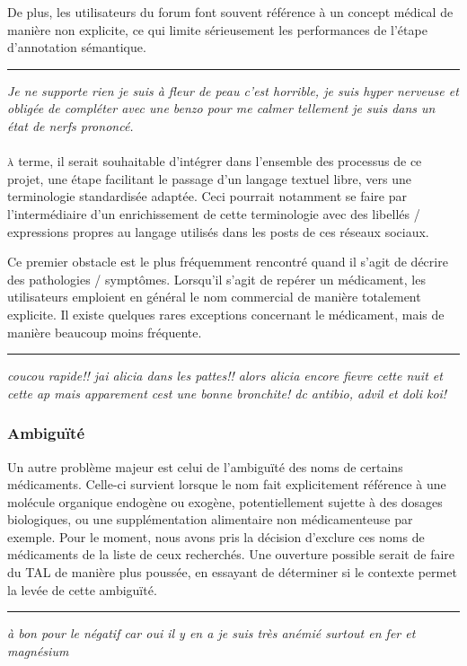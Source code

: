 \documentclass[a4paper, 12pt, openany, oneside, abstract=on]{article} %
\begin{document}
De plus, les utilisateurs du forum font souvent référence à un concept médical de manière non explicite, ce qui limite sérieusement les performances de l'étape d'annotation sémantique.
\begin{center}\quad\rule{5in}{0.8pt}\end{center}
\emph{\og{}Je ne supporte rien je suis à fleur de peau c’est horrible, je suis hyper nerveuse et obligée de compléter avec une benzo pour me calmer tellement je suis dans un état de nerfs prononcé.\fg{}}\\
\\
\textsc{à} terme, il serait souhaitable d'intégrer dans l'ensemble des processus de ce projet, une étape facilitant le passage d'un langage textuel libre, vers une terminologie standardisée adaptée. Ceci pourrait notamment se faire par l'intermédiaire d'un enrichissement de cette terminologie avec des libellés / expressions propres au langage utilisés dans les posts de ces réseaux sociaux.

Ce premier obstacle est le plus fréquemment rencontré quand il s'agit de décrire des pathologies / symptômes. Lorsqu'il s'agit de repérer un médicament, les utilisateurs emploient en général le nom commercial de manière totalement explicite. Il existe quelques rares exceptions concernant le médicament, mais de manière beaucoup moins fréquente.
\begin{center}\quad\rule{5in}{0.8pt}\end{center}
\emph{\og{}coucou rapide!! jai alicia dans les pattes!! alors alicia encore fievre cette nuit et cette ap mais apparement cest une bonne bronchite! dc antibio, advil et doli koi!\fg{}}

\subsubsection{Ambiguïté}
\label{ambig}
Un autre problème majeur est celui de l'ambiguïté des noms de certains médicaments. Celle-ci survient lorsque le nom fait explicitement référence à une molécule organique endogène ou exogène, potentiellement sujette à des dosages biologiques, ou une supplémentation alimentaire non médicamenteuse par exemple. Pour le moment, nous avons pris la décision d'exclure ces noms de médicaments de la liste de ceux recherchés. Une ouverture possible serait de faire du TAL de manière plus poussée, en essayant de déterminer si le contexte permet la levée de cette ambiguïté.
\begin{center}\quad\rule{5in}{0.8pt}\end{center}
\emph{\og{}à  bon pour le négatif car oui il y en a je suis très anémié surtout en fer et magnésium\fg{}}
\end{document}
